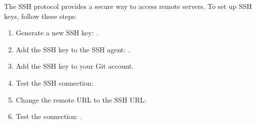 The SSH protocol provides a secure way to access remote servers. To set up SSH keys, follow these steps:

    \begin{enumerate}
        \item Generate a new SSH key: .
        \item Add the SSH key to the SSH agent: \newline {}.
        \item Add the SSH key to your Git account.
        \item Test the SSH connection: 
        \item Change the remote URL to the SSH URL: 
        \item Test the connection: .
    \end{enumerate}



    